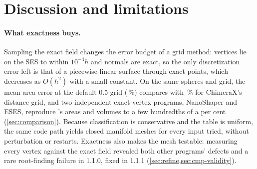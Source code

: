 
\section{Discussion and limitations}
\label{sec:discussion}

\paragraph{What exactness buys.}
Sampling the exact field changes the error budget of a grid method:
vertices lie on the SES to within $10^{-4}h$ and normals are exact, so the
only discretization error left is that of a piecewise-linear surface
through exact points, which decreases as $O(h^2)$ with a small constant.
On the same spheres and grid, the mean area error at the default 0.5\Ang{}
grid (\,\%) compares with
\,\% for ChimeraX's distance grid, and two
independent exact-vertex programs, NanoShaper and ESES, reproduce \sesmesh's
areas and volumes to a few hundredths of a per cent
(\cref{sec:comparison}). Because classification is conservative and the
table is uniform, the same code path yields closed manifold meshes for
every input tried, without perturbation or restarts. Exactness also makes
the mesh testable: measuring every vertex against the exact field revealed
both other programs' defects and a rare root-finding failure in \sesmesh{}
1.1.0, fixed in 1.1.1 (\cref{sec:refine,sec:cmp-validity}).

